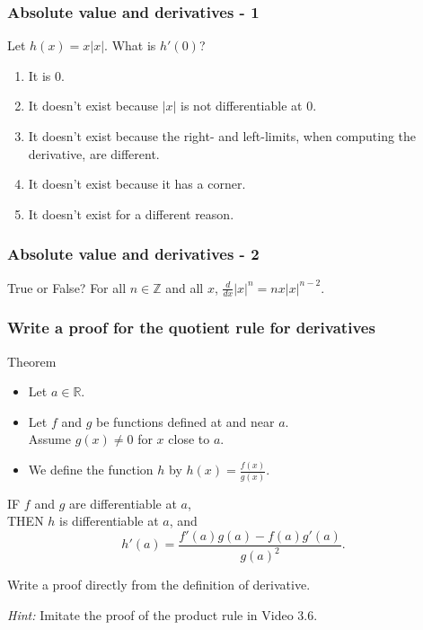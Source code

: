 \documentclass[14pt]{beamer}
\begin{document}
\begin{frame}[t]
	\frametitle{Absolute value and derivatives - 1}

	Let $h(x) = x|x|$. What is $h'(0)$?

	\begin{enumerate}
		\item It is 0.

		\item It doesn't exist because $|x|$ is not differentiable at $0$.

		\item It doesn't exist because the right- and left-limits, when computing the
			derivative, are different.

		\item It doesn't exist because it has a corner.

		\item It doesn't exist for a different reason.
	\end{enumerate}
\end{frame}

\begin{frame}[t]
	\frametitle{Absolute value and derivatives - 2}

	\begin{block}{True or False?}
		For all $n \in \mathbb{Z}$ and all $x$, $\frac{d}{dx}|x|^{n}=nx|x|^{n-2}$.
	\end{block}
\end{frame}

\begin{frame}[t]
	\fontsize{13}{13}\selectfont
	\frametitle{Write a proof for the quotient rule for derivatives}

	\begin{block}{Theorem}
		\begin{itemize}
			\item Let $a \in \mathbb{R}$.

			\item Let $f$ and $g$ be functions defined at and near $a$. \\ Assume
				$g(x) \neq 0$ for $x$ close to $a$.

			\item We define the function $h$ by $\displaystyle h(x) = \frac{f(x)}{g(x)}$.
		\end{itemize}

		IF $f$ and $g$ are differentiable at $a$, \\ THEN $h$ is differentiable at $a$,
		and
		\[
			h'(a) = \frac{f'(a) g(a) - f(a) g'(a)}{g(a)^{2}}.
		\]
	\end{block}

	\vfill

	Write a proof directly from the definition of derivative.

	\emph{Hint:} Imitate the proof of the product rule in Video 3.6.
\end{frame}
\end{document}
